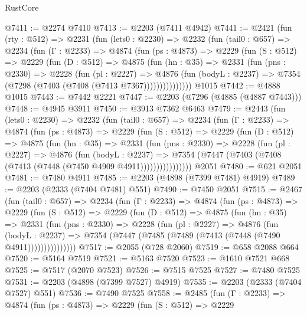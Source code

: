 \begin{lexlean}{RustCore}
\begin{coremodule}
@7411 := @2274 @7410
@7413 := @2203 (@7411 @4942)
@7441 := @2421
    (fun (rty : @512) =>
    @2231
      (fun (lets0 : @2230) =>
      @2232
        (fun (tail0 : @657) =>
        @2234
          (fun (Γ : @2233) =>
          @4874
            (fun (ps : @4873) =>
            @2229
              (fun (S : @512) =>
              @2229
                (fun (D : @512) =>
                @4875
                  (fun (hn : @35) =>
                  @2331
                    (fun (pns : @2330) =>
                    @2228
                      (fun (pl : @2227) =>
                      @4876
                        (fun (bodyL : @2237) =>
                        @7354 (@7298 (@7403 (@7408 (@7413 @7367)))))))))))))))
    @1015
@7442 := @4888 @1015
@7443 := @7442 @2221
@7447 := @2203 (@7296 (@4885 (@4887 @7443)))
@7448 := @4945 @3911
@7450 := @3913 @7362 @6463
@7479 := @2443
    (fun (lets0 : @2230) =>
    @2232
      (fun (tail0 : @657) =>
      @2234
        (fun (Γ : @2233) =>
        @4874
          (fun (ps : @4873) =>
          @2229
            (fun (S : @512) =>
            @2229
              (fun (D : @512) =>
              @4875
                (fun (hn : @35) =>
                @2331
                  (fun (pns : @2330) =>
                  @2228
                    (fun (pl : @2227) =>
                    @4876
                      (fun (bodyL : @2237) =>
                      @7354 (@7447 (@7403 (@7408 (@7413 (@7448 (@7450 @4909 @4911))))))))))))))))
    @2051
@7480 := @621 @2051
@7481 := @7480 @4911
@7485 := @2203 (@4898 (@7399 @7481) @4919)
@7489 := @2203 (@2333 (@7404 @7481) @551)
@7490 := @7450 @2051
@7515 := @2467
    (fun (tail0 : @657) =>
    @2234
      (fun (Γ : @2233) =>
      @4874
        (fun (ps : @4873) =>
        @2229
          (fun (S : @512) =>
          @2229
            (fun (D : @512) =>
            @4875
              (fun (hn : @35) =>
              @2331
                (fun (pns : @2330) =>
                @2228
                  (fun (pl : @2227) =>
                  @4876
                    (fun (bodyL : @2237) =>
                    @7354 (@7447 (@7485 (@7489 (@7413 (@7448 (@7490 @4911)))))))))))))))
@7517 := @2055 (@728 @2060)
@7519 := @658 @2088 @664
@7520 := @5164 @7519
@7521 := @5163 @7520
@7523 := @1610 @7521 @668
@7525 := @7517 (@2070 @7523)
@7526 := @7515 @7525
@7527 := @7480 @7525
@7531 := @2203 (@4898 (@7399 @7527) @4919)
@7535 := @2203 (@2333 (@7404 @7527) @551)
@7536 := @7490 @7525
@7558 := @2485
    (fun (Γ : @2233) =>
    @4874
      (fun (ps : @4873) =>
      @2229
        (fun (S : @512) =>
        @2229

\end{coremodule}
\end{lexlean}
